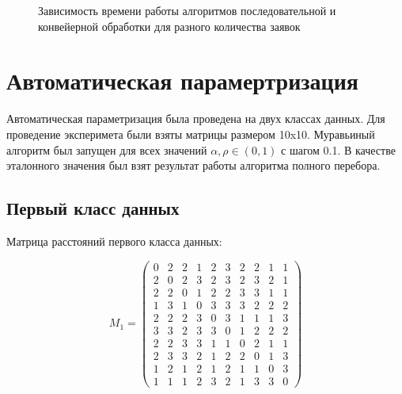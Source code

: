 \documentclass[a4paper,14pt, unknownkeysallowed]{extreport}
\begin{document}
\begin{center}
	\begin{figure}[h!]
	\center
	\caption{Зависимость времени работы алгоритмов последовательной и конвейерной обработки для разного количества заявок}
	\label{ris}
	\end{figure}
\end{center}

\section{Автоматическая парамертризация}

Автоматическая параметризация была проведена на двух классах данных. Для проведение эксперимета были взяты матрицы размером 10x10. Муравьиный алгоритм был запущен для всех значений $\alpha, \rho \in (0, 1)$ с шагом 0.1.
В качестве эталонного значения был взят результат работы алгоритма полного перебора. 

\subsection{Первый класс данных}

Матрица расстояний первого класса данных:

\begin{equation}
    \label{eq:kd1}
	M_{1} = \begin{pmatrix}
		0 & 2 & 2 & 1 & 2 & 3 & 2 & 2 & 1 & 1 \\ 
        2 & 0 & 2 & 3 & 2 & 3 & 2 & 3 & 2 & 1 \\ 
        2 & 2 & 0 & 1 & 2 & 2 & 3 & 3 & 1 & 1 \\ 
        1 & 3 & 1 & 0 & 3 & 3 & 3 & 2 & 2 & 2 \\ 
        2 & 2 & 2 & 3 & 0 & 3 & 1 & 1 & 1 & 3 \\ 
        3 & 3 & 2 & 3 & 3 & 0 & 1 & 2 & 2 & 2 \\ 
        2 & 2 & 3 & 3 & 1 & 1 & 0 & 2 & 1 & 1 \\ 
        2 & 3 & 3 & 2 & 1 & 2 & 2 & 0 & 1 & 3 \\ 
        1 & 2 & 1 & 2 & 1 & 2 & 1 & 1 & 0 & 3 \\ 
        1 & 1 & 1 & 2 & 3 & 2 & 1 & 3 & 3 & 0  
	\end{pmatrix}
\end{equation}
\end{document}
